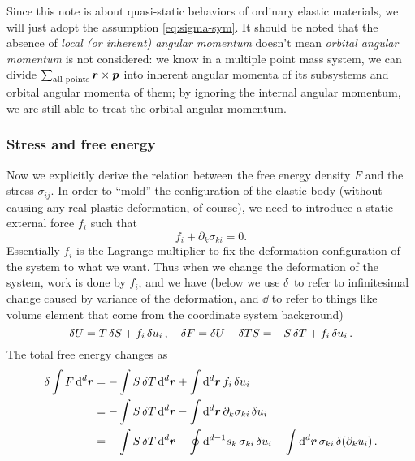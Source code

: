 \documentclass[hyperref, a4paper]{article}
\begin{document}
Since this note is about quasi-static behaviors of ordinary elastic materials,
we will just adopt the assumption \eqref{eq:sigma-sym}.
It should be noted that the absence of \emph{local (or inherent) angular momentum} 
doesn't mean \emph{orbital angular momentum} is not considered: 
we know in a multiple point mass system, 
we can divide $\sum_{\text{all points}} \vb*{r} \times \vb*{p}$
into inherent angular momenta of its subsystems 
and orbital angular momenta of them; 
by ignoring the internal angular momentum, 
we are still able to treat the orbital angular momentum.

\subsubsection{Stress and free energy}

Now we explicitly derive the relation between the free energy density $F$
and the stress $\sigma_{ij}$.
In order to ``mold'' the configuration of the elastic body 
(without causing any real plastic deformation, of course),
we need to introduce a static external force $f_i$ such that 
\begin{equation}
    f_i + \partial_k \sigma_{ki} = 0.
\end{equation}
Essentially $f_i$ is the Lagrange multiplier 
to fix the deformation configuration of the system to what we want.
Thus when we change the deformation of the system,
work is done by $f_i$,
and we have (below we use $\var$ to refer to infinitesimal change 
caused by variance of the deformation,
and $\dd$ to refer to things like volume element 
that come from the coordinate system background)
\begin{equation}
    \var{U} = T \var{S} + f_i \var{u}_i, \quad 
    \var{F} = \var{U} - \var{TS} = - S \var{T} + f_i \var{u}_i.
\end{equation}
The total free energy changes as 
\begin{equation}
    \begin{aligned}
        \var \int F \dd[d]{\vb*{r}} &= - \int S \var{T} \dd[d]{\vb*{r}} 
        + \int \dd[d]{\vb*{r}} f_i \var{u_i}  \\
        &= - \int S \var{T} \dd[d]{\vb*{r}} 
        - \int \dd[d]{\vb*{r}} \partial_k \sigma_{ki} \var{u_i} \\
        &= - \int S \var{T} \dd[d]{\vb*{r}}
        - \oint \dd[d-1]{s_k} \sigma_{ki} \var{u_i}
        + \int \dd[d]{\vb*{r}} \sigma_{ki} \var (\partial_k u_i).
    \end{aligned}
\end{equation}
\end{document}

